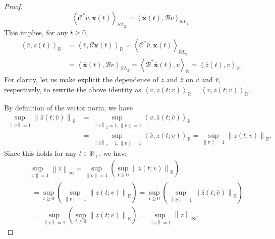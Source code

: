 \documentclass[letterpaper, 10 pt, conference]{ieeeconf}
\newcommand{\R}{\mathbb{R}}
\newcommand{\ip}[2]{\left\langle #1,#2\right\rangle}
\newcommand{\mcl}[1]{\mathcal{#1}}
\newcommand{\mbf}[1]{\mathbf{#1}}
\newcommand{\norm}[1]{\left\lVert #1 \right\rVert}
\theoremstyle{definition}
\begin{document}
\begin{proof}
\[
    \ip{\mcl C^* \bar v}{ \mbf x(t)}_{\R L_2}=\ip{\bar{\mbf x}(t)}{\mcl B v}_{\R L_2}.
\]
This implies, for any $t\ge 0$,
\begin{align*}
\ip{\bar v}{ z(t)}_{\R}&= \ip{\bar v}{ \mcl C \mbf x(t)}_{\R}=\ip{\mcl C^*\bar v}{ \mbf x(t)}_{\R L_2}\\
&=\ip{\bar{\mbf x}(t)}{\mcl Bv}_{\R L_2}=\ip{\mcl B^*\bar{\mbf x}(t)}{v}_{\R} =\ip{\bar{z}(t)}{v}_{\R}.
\end{align*}
For clarity, let us make explicit the dependence of $z$ and $\bar z$ on $v$ and $\bar v$, respectively, to rewrite the above identity as $\ip{\bar v}{z(t;v)}_{\R} = \ip{v}{\bar z(t;\bar v)}_{\R}$.

By definition of the vector norm, we have
\begin{align*}
    \sup_{\norm{\bar{v}}=1}\norm{\bar{z}(t;\bar{v})}_{\mathbb{R}} &= \sup_{\norm{\bar v}_2=1,\norm{v}=1}\!\!\!\!\ip{v}{\bar z(t;\bar v)}_{\R}\\
    & = \sup_{\norm{\bar v}_2=1,\norm{v}=1}\!\!\!\!\ip{\bar v}{z(t;v)}_{\R}\!\!=\!\! \sup_{\norm{v}=1}\norm{z(t;v)}_{\mathbb{R}}.
\end{align*}
Since this holds for any $t\in \R_+$, we have 
\begin{align*}
&\sup_{\norm{v}=1} \norm{z}_{\infty} = \sup_{\norm{v}=1}\left(\sup_{t\ge 0} \norm{z(t;v)}_{\mathbb{R}}\right)\\
&\quad =\sup_{t\ge 0} \left(\sup_{\norm{v}=1} \norm{z(t;v)}_{\mathbb{R}}\right)=\sup_{t\ge 0} \left(\sup_{\norm{\bar v}=1} \norm{\bar z(t;\bar v)}_{\mathbb{R}}\right)\\
&\quad =\sup_{\norm{\bar v}=1} \left(\sup_{t\ge 0} \norm{\bar z(t;\bar v)}_{\mathbb{R}}\right)= \sup_{\norm{\bar v}=1} \norm{\bar z}_{\infty}. 
\end{align*}

\end{proof}
\end{document}
